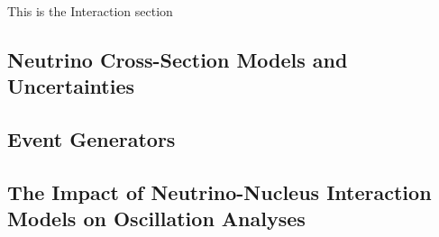 This is the Interaction section
\subsection{Neutrino Cross-Section Models and Uncertainties}
\subsection{Event Generators}
\subsection{The Impact of Neutrino-Nucleus Interaction Models on Oscillation Analyses}
